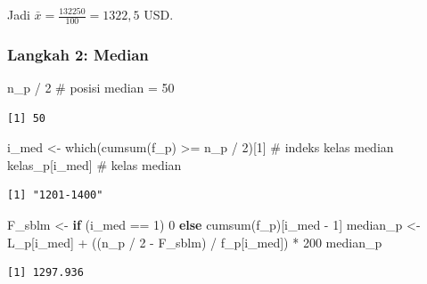 \documentclass[
  indonesian,
  letterpaper,
]{book}
\newenvironment{Shaded}{\begin{snugshade}}{\end{snugshade}}
\newcommand{\CommentTok}[1]{\textcolor[rgb]{0.37,0.37,0.37}{#1}}
\newcommand{\ControlFlowTok}[1]{\textcolor[rgb]{0.00,0.23,0.31}{\textbf{#1}}}
\newcommand{\DecValTok}[1]{\textcolor[rgb]{0.68,0.00,0.00}{#1}}
\newcommand{\FunctionTok}[1]{\textcolor[rgb]{0.28,0.35,0.67}{#1}}
\newcommand{\NormalTok}[1]{\textcolor[rgb]{0.00,0.23,0.31}{#1}}
\newcommand{\OtherTok}[1]{\textcolor[rgb]{0.00,0.23,0.31}{#1}}
\newcommand{\SpecialCharTok}[1]{\textcolor[rgb]{0.37,0.37,0.37}{#1}}
\begin{document}
Jadi \(\bar{x} = \frac{132250}{100} = 1322{,}5\) USD.

\subsubsection{Langkah 2: Median}\label{langkah-2-median}

\begin{Shaded}
\begin{Highlighting}[]
\NormalTok{n\_p }\SpecialCharTok{/} \DecValTok{2}                                        \CommentTok{\# posisi median = 50}
\end{Highlighting}
\end{Shaded}

\begin{verbatim}
[1] 50
\end{verbatim}

\begin{Shaded}
\begin{Highlighting}[]
\NormalTok{i\_med }\OtherTok{\textless{}{-}} \FunctionTok{which}\NormalTok{(}\FunctionTok{cumsum}\NormalTok{(f\_p) }\SpecialCharTok{\textgreater{}=}\NormalTok{ n\_p }\SpecialCharTok{/} \DecValTok{2}\NormalTok{)[}\DecValTok{1}\NormalTok{]      }\CommentTok{\# indeks kelas median}
\NormalTok{kelas\_p[i\_med]                                 }\CommentTok{\# kelas median}
\end{Highlighting}
\end{Shaded}

\begin{verbatim}
[1] "1201-1400"
\end{verbatim}

\begin{Shaded}
\begin{Highlighting}[]
\NormalTok{F\_sblm }\OtherTok{\textless{}{-}} \ControlFlowTok{if}\NormalTok{ (i\_med }\SpecialCharTok{==} \DecValTok{1}\NormalTok{) }\DecValTok{0} \ControlFlowTok{else} \FunctionTok{cumsum}\NormalTok{(f\_p)[i\_med }\SpecialCharTok{{-}} \DecValTok{1}\NormalTok{]}
\NormalTok{median\_p }\OtherTok{\textless{}{-}}\NormalTok{ L\_p[i\_med] }\SpecialCharTok{+}\NormalTok{ ((n\_p }\SpecialCharTok{/} \DecValTok{2} \SpecialCharTok{{-}}\NormalTok{ F\_sblm) }\SpecialCharTok{/}\NormalTok{ f\_p[i\_med]) }\SpecialCharTok{*} \DecValTok{200}
\NormalTok{median\_p}
\end{Highlighting}
\end{Shaded}

\begin{verbatim}
[1] 1297.936
\end{verbatim}
\end{document}

